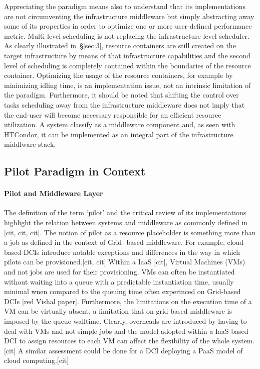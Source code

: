 \documentclass{sig-alternate}
\begin{document}
Appreciating the \pilot paradigm means also to understand that its
implementations are not circumventing the infrastructure middleware but
simply abstracting away some of its properties in order to optimize one
or more user-defined performance metric. Multi-level scheduling is not
replacing the infrastructure-level scheduler. As clearly illustrated
in~\S\ref{sec:3}, resource containers are still created on the target
infrastructure by means of that infrastructure capabilities and the
second level of scheduling is completely contained within the boundaries
of the resource container. Optimizing the usage of the resource
containers, for example by minimizing idling time, is an implementation
issue, not an intrinsic limitation of the \pilot paradigm. Furthermore,
it should be noted that shifting the control over tasks scheduling away
from the infrastructure middleware does not imply that the end-user will
become necessary responsible for an efficient resource utilization. A
\pilot system classify as a middleware component and, as seen with
HTCondor, it can be implemented as an integral part of the
infrastructure middlware stack.


\subsection{Pilot Paradigm in Context}
\label{sec:5.2}

\paragraph*{Pilot and Middleware Layer} The definition of the term
`pilot' and the critical review of its implementations highlight the
relation between \pilot systems and middleware as commonly defined in
[cit, cit, cit]. The notion of pilot as a resource placeholder is
something more than a job as defined in the context of Grid- based
middleware. For example, cloud-based DCIs  introduce notable exceptions
and differences in the way in which pilots can be provisioned.[cit, cit]
Within a IaaS [cit], Virtual Machines (VMs) and not jobs are used for
their provisioning. VMs can often be instantiated without waiting into a
queue  with a predictable instantiation time, usually minimal wnen
compared to the queuing time often experinced on Grid-based DCIs [red
Vishal paper]. Furthermore, the limitations on the execution time of a
VM can be virtually absent, a limitation that on grid-based middleware
is imposed by the queue walltime. Clearly, overheads are introduced by
having to deal with VMs and not simple jobs and the model adopted within
a IaaS-based DCI to assign resources to each VM can affect the
flexibility of the whole \pilotjob system. [cit] A similar assessment
could be done for a DCI deploying a PaaS model of cloud computing.[cit]
\end{document}
